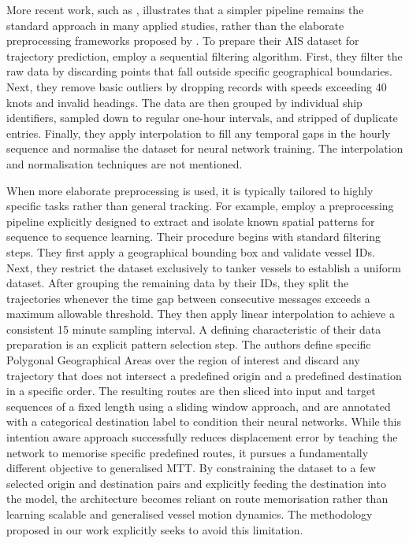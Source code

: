 More recent work, such as \textcite{zaman2024deep}, illustrates that a simpler pipeline remains the standard approach in many applied studies, rather than the elaborate preprocessing frameworks proposed by \textcite{Zhao_Shi_Yang_2018}.
To prepare their \ac{AIS} dataset for trajectory prediction, \citeauthor{zaman2024deep} employ a sequential filtering algorithm.
First, they filter the raw data by discarding points that fall outside specific geographical boundaries.
Next, they remove basic outliers by dropping records with speeds exceeding 40 knots and invalid headings.
The data are then grouped by individual ship identifiers, sampled down to regular one-hour intervals, and stripped of duplicate entries.
Finally, they apply interpolation to fill any temporal gaps in the hourly sequence and normalise the dataset for neural network training.
The interpolation and normalisation techniques are not mentioned.

When more elaborate preprocessing is used, it is typically tailored to highly specific tasks rather than general tracking.
For example, \textcite{Capobianco_2021} employ a preprocessing pipeline explicitly designed to extract and isolate known spatial patterns for sequence to sequence learning. Their procedure begins with standard filtering steps. 
They first apply a geographical bounding box and validate vessel IDs.
Next, they restrict the dataset exclusively to tanker vessels to establish a uniform dataset.
After grouping the remaining data by their IDs, they split the trajectories whenever the time gap between consecutive messages exceeds a maximum allowable threshold. They then apply linear interpolation to achieve a consistent 15 minute sampling interval.
A defining characteristic of their data preparation is an explicit pattern selection step.
The authors define specific Polygonal Geographical Areas over the region of interest and discard any trajectory that does not intersect a predefined origin and a predefined destination in a specific order.
The resulting routes are then sliced into input and target sequences of a fixed length using a sliding window approach, and are annotated with a categorical destination label to condition their neural networks.
While this intention aware approach successfully reduces displacement error by teaching the network to memorise specific predefined routes, it pursues a fundamentally different objective to generalised \ac{MTT}.
By constraining the dataset to a few selected origin and destination pairs and explicitly feeding the destination into the model, the architecture becomes reliant on route memorisation rather than learning scalable and generalised vessel motion dynamics.
The methodology proposed in our work explicitly seeks to avoid this limitation.

